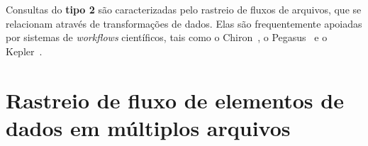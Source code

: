 Consultas do \textbf{tipo 2} são caracterizadas pelo rastreio de fluxos de arquivos, que se relacionam através de transformações de dados. Elas são frequentemente apoiadas por sistemas de \textit{workflows} científicos, tais como o Chiron~\cite{ogasawara2011algebraic}, o Pegasus~\cite{deelman2005pegasus} e o Kepler~\cite{ludascher2006scientific}.


\section{Rastreio de fluxo de elementos de dados em múltiplos arquivos}%
\label{sec:rastreio-de-elemento-de-dados-em-multiplos-arquivos}
